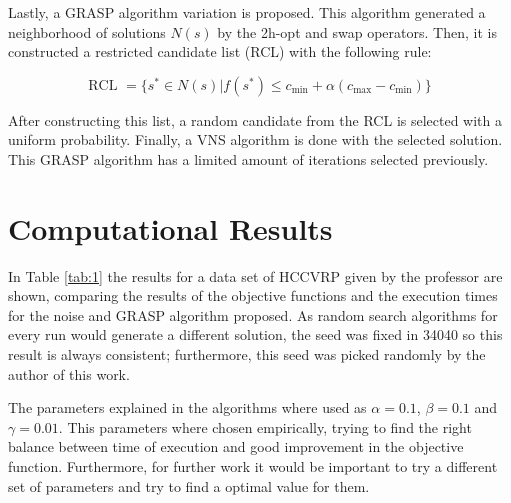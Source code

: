 \documentclass[10pt,twoside]{article}
\begin{document}
Lastly, a GRASP algorithm variation is proposed. This algorithm
generated a neighborhood of solutions $N(s)$ by the 2h-opt and swap
operators. Then, it is constructed a restricted candidate list (RCL)
with the following rule:

\begin{equation}
  \text{RCL } = \{s^* \in N(s)| f(s^*) \le c_{\min} + \alpha (c_{\max} - c_{\min})\}
\end{equation}

After constructing this list, a random candidate from the RCL is
selected with a uniform probability. Finally, a VNS algorithm is done
with the selected solution. This GRASP algorithm has a limited amount
of iterations selected previously.


\section{Computational Results}\label{sec_results}
In Table \ref{tab:1} the results for a data set of HCCVRP given by
the professor are shown, comparing the results of the objective
functions and the execution times for the noise and GRASP algorithm
proposed. As random search algorithms for every run would generate a
different solution, the seed was fixed in 34040 so this result is
always consistent; furthermore, this seed was picked randomly by the
author of this work.

The parameters explained in the algorithms where used as
$\alpha=0.1$, $\beta=0.1$ and $\gamma=0.01$. This parameters where
chosen empirically, trying to find the right balance between time of
execution and good improvement in the objective function.
Furthermore, for further work it would be important to try a
different set of parameters and try to find a optimal value for them.
\end{document}
